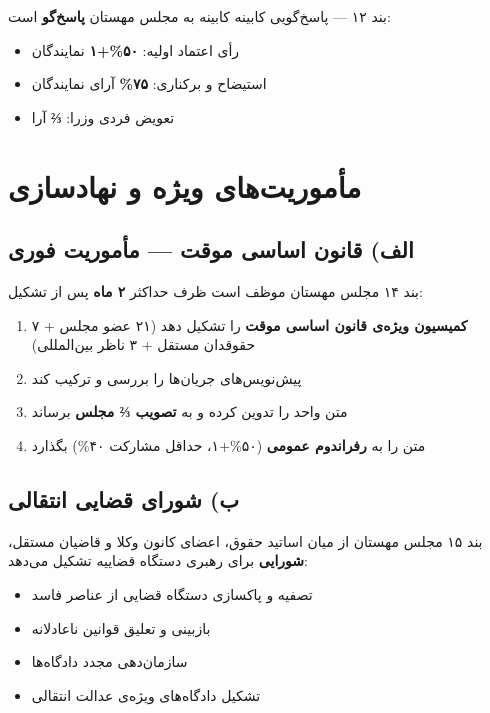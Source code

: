 \documentclass[12pt,a4paper,twoside,openany]{book}
\begin{document}
	\begin{bandbox}{بند ۱۲ --- پاسخ‌گویی کابینه}
		کابینه به مجلس مهستان \textbf{پاسخ‌گو} است:
		\begin{itemize}
			\item رأی اعتماد اولیه: \textbf{۵۰\%+۱} نمایندگان
			\item استیضاح و برکناری: \textbf{۷۵\%} آرای نمایندگان
			\item تعویض فردی وزرا: \textbf{⅔} آرا
		\end{itemize}
	\end{bandbox}
	
	\section{مأموریت‌های ویژه و نهادسازی}
	
	\subsection{الف) قانون اساسی موقت --- مأموریت فوری}
	
	\begin{bandbox}{بند ۱۴}
		مجلس مهستان موظف است ظرف حداکثر \textbf{۲ ماه} پس از تشکیل:
		\begin{enumerate}
			\item \textbf{کمیسیون ویژه‌ی قانون اساسی موقت} را تشکیل دهد (۲۱ عضو مجلس + ۷ حقوقدان مستقل + ۳ ناظر بین‌المللی)
			\item پیش‌نویس‌های جریان‌ها را بررسی و ترکیب کند
			\item متن واحد را تدوین کرده و به \textbf{تصویب ⅔ مجلس} برساند
			\item متن را به \textbf{رفراندوم عمومی} (۵۰\%+۱، حداقل مشارکت ۴۰\%) بگذارد
		\end{enumerate}
	\end{bandbox}
	
	\subsection{ب) شورای قضایی انتقالی}
	
	\begin{bandbox}{بند ۱۵}
		مجلس مهستان از میان اساتید حقوق، اعضای کانون وکلا و قاضیان مستقل، \textbf{شورایی}
		برای رهبری دستگاه قضاییه تشکیل می‌دهد:
		\begin{itemize}
			\item تصفیه و پاکسازی دستگاه قضایی از عناصر فاسد
			\item بازبینی و تعلیق قوانین ناعادلانه
			\item سازمان‌دهی مجدد دادگاه‌ها
			\item تشکیل دادگاه‌های ویژه‌ی عدالت انتقالی
		\end{itemize}
	\end{bandbox}
	
\end{document}
